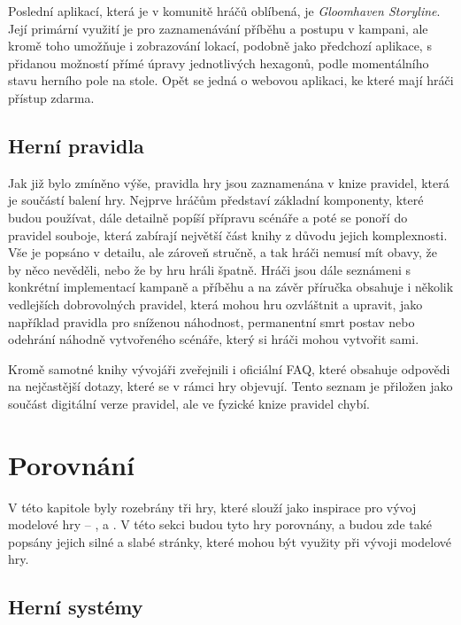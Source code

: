Poslední aplikací, která je v komunitě hráčů oblíbená, je \textit{Gloomhaven Storyline}. Její primární využití je pro zaznamenávání příběhu a postupu v kampani, ale kromě toho umožňuje i zobrazování lokací, podobně jako předchozí aplikace, s přidanou možností přímé úpravy jednotlivých hexagonů, podle momentálního stavu herního pole na stole. Opět se jedná o webovou aplikaci, ke které mají hráči přístup zdarma.

\subsection{Herní pravidla}
\label{subsec:gh_rules}

Jak již bylo zmíněno výše, pravidla hry jsou zaznamenána v knize pravidel, která je součástí balení hry. Nejprve hráčům představí základní komponenty, které budou používat, dále detailně popíší přípravu scénáře a poté se ponoří do pravidel souboje, která zabírají největší část knihy z důvodu jejich komplexnosti. Vše je popsáno v detailu, ale zároveň stručně, a tak hráči nemusí mít obavy, že by něco nevěděli, nebo že by hru hráli špatně. Hráči jsou dále seznámeni s konkrétní implementací kampaně a příběhu a na závěr příručka obsahuje i několik vedlejších dobrovolných pravidel, která mohou hru ozvláštnit a upravit, jako například pravidla pro sníženou náhodnost, permanentní smrt postav nebo odehrání náhodně vytvořeného scénáře, který si hráči mohou vytvořit sami.

Kromě samotné knihy vývojáři zveřejnili i oficiální FAQ, které obsahuje odpovědi na nejčastější dotazy, které se v rámci hry objevují. Tento seznam je přiložen jako součást digitální verze pravidel, ale ve fyzické knize pravidel chybí.



\section{Porovnání}
\label{sec:comparison}

V této kapitole byly rozebrány tři hry, které slouží jako inspirace pro vývoj modelové hry -- ,  a . V této sekci budou tyto hry porovnány, a budou zde také popsány jejich silné a slabé stránky, které mohou být využity při vývoji modelové hry.

\subsection{Herní systémy}
\label{subsec:comparison_gameplay}

